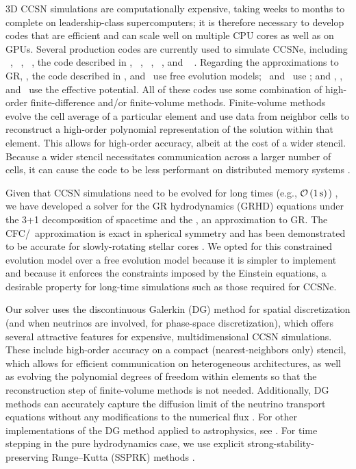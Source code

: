 3D CCSN simulations are computationally expensive,
taking weeks to months to complete
on leadership-class supercomputers; it is therefore
necessary to develop codes that are efficient and can scale well on
multiple CPU cores as well as on GPUs.
Several production codes are currently used to simulate CCSNe, including
\flashx\ \citep{for2000},
\cocov\ \citep{mjd2010},
\zelmani\ \citep{oao2012},
the code described in \citet{ktk2016},
\fornax\ \citep{sdb2019},
\nadafld\ \citep{rjj2019},
\chimera\ \citep{bbh2020},
and \gmunu\ \citep{cht2023}
%
.
Regarding the approximations to GR, \zelmani, the code described in
\citet{ktk2016}, and \nadafld\ use free evolution models;
\cocov\ and \gmunu\ use \xcfc;
and \fornax, \chimera, and \flashx\ use the effective potential.
All of these codes use some combination of high-order finite-difference
and/or finite-volume methods.
Finite-volume methods \citep[e.g., see][]{l2002} evolve the cell average
of a particular element and use data from neighbor cells to reconstruct
a high-order polynomial representation of the solution within that element.
This allows for high-order accuracy, albeit at the cost of a wider stencil.
Because a wider stencil necessitates communication across a larger number of
cells, it can cause the code to be less performant on distributed memory systems
\citeme.

Given that CCSN simulations need to be evolved for long times
(e.g., $\mathcal{O}\left(1\,\mathrm{s}\right)$)
\citeme, we have developed a
solver for the GR hydrodynamics (GRHD) equations under the 3+1 decomposition of
spacetime and the \xcfc, an approximation to GR.
The CFC/\xcfc\ approximation is exact in spherical
symmetry and has been demonstrated to be accurate for slowly-rotating stellar
cores \citep{dfm2002,mjd2010}.
We opted for this constrained evolution model over a free evolution model
because it is simpler to implement and because it enforces the constraints
imposed by the Einstein equations,
a desirable property for long-time simulations such as those
required for CCSNe.

Our solver uses the discontinuous Galerkin (DG) method for spatial
discretization (and when neutrinos are involved, for phase-space discretization),
which offers several attractive features for expensive,
multidimensional CCSN simulations.
These include high-order accuracy on a compact (nearest-neighbors only)
stencil, which allows for efficient communication on heterogeneous
architectures, as well as evolving the polynomial degrees of freedom
within elements so that the reconstruction step of finite-volume methods
is not needed.
Additionally, DG methods can accurately capture the diffusion limit of the
neutrino transport equations without any modifications to the numerical flux
\citeme.
For other implementations of the DG method applied to astrophysics,
see \citet{sbc2015,kff2017}.
For time stepping in the pure hydrodynamics case, we use
explicit strong-stability-preserving Runge--Kutta (SSPRK) methods
\citep[e.g., see][]{gst2001}.

